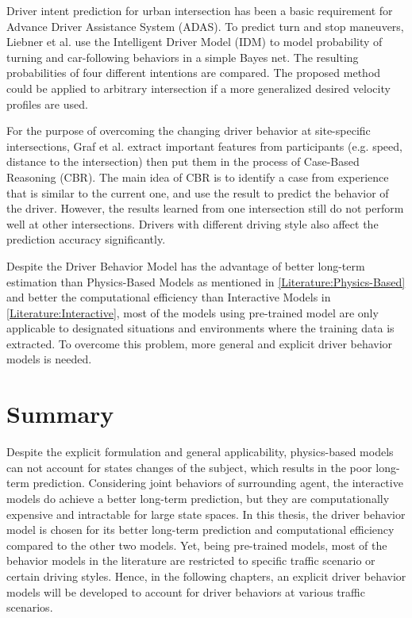 Driver intent prediction for urban intersection has been a basic requirement for Advance Driver Assistance System (ADAS). To predict turn and stop maneuvers, Liebner et al. \cite{Liebner2012} use the Intelligent Driver Model (IDM) to model probability of turning and car-following behaviors in a simple Bayes net. The resulting probabilities of four different intentions are compared. The proposed method could be applied to arbitrary intersection if a more generalized desired velocity profiles are used.

For the purpose of overcoming the changing driver behavior at site-specific intersections, Graf et al. \cite{Graf2014} extract important features from participants (e.g. speed, distance to the intersection) then put them in the process of Case-Based Reasoning (CBR). The main idea of CBR is to identify a case from experience that is similar to the current one, and use the result to predict the behavior of the driver. However, the results learned from one intersection still do not perform well at other intersections. Drivers with different driving style also affect the prediction accuracy significantly.   

Despite the Driver Behavior Model has the advantage of better long-term estimation than Physics-Based Models as mentioned in \ref{Literature:Physics-Based} and better the computational efficiency than Interactive Models in \ref{Literature:Interactive}, most of the models using pre-trained model are only applicable to designated situations and environments where the training data is extracted. To overcome this problem, more general and explicit driver behavior models is needed.



\section{Summary}
Despite the explicit formulation and general applicability, physics-based models can not account for states changes of the subject, which results in the poor long-term prediction. Considering joint behaviors of surrounding agent, the interactive models do achieve a better long-term prediction, but they are computationally expensive and intractable for large state spaces. In this thesis, the driver behavior model is chosen for its better long-term prediction and computational efficiency compared to the other two models. Yet, being pre-trained models, most of the behavior models in the literature are restricted to specific traffic scenario or certain driving styles. Hence, in the following chapters, an explicit driver behavior models will be developed to account for driver behaviors at various traffic scenarios.

